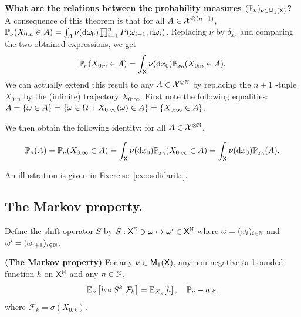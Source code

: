 \documentclass[english,graybox,envcountchap,envcountsame,sectrefs,shortlabels]{svmono}
\theoremstyle{style}
\newcommand{\bs}{\begin{shaded}}
\newcommand{\es}{\end{shaded}}
\begin{document}
\textbf{What are the relations between the probability measures $(\mathbb{P}_{\nu})_{\nu\in\mathsf{M}_{1}(\mathsf{X})}$?}
A consequence of this theorem is that for all $A\in\mathcal{X}^{\otimes(n+1)}$,
$\mathbb{P}_{\nu}(X_{0:n}\in A)=\int_{A}\nu(\mathrm{d}\omega_{0})\prod_{i=1}^{n}P(\omega_{i-1},\mathrm{d}\omega_{i})$.
Replacing $\nu$ by $\delta_{x_{0}}$ and comparing the two obtained
expressions, we get
\[
\mathbb{P}_{\nu}(X_{0:n}\in A)=\int_{\mathsf{X}}\nu(\mathrm{d} x_{0})\mathbb{P}_{x_{0}}(X_{0:n}\in A).
\]
We can actually extend this result to any $A\in\mathcal{X}^{\otimes\mathbb{N}}$
by replacing the $n+1$ -tuple $X_{0:n}$ by the (infinite) trajectory
$X_{0:\infty}$. First note the following equalities: $A=\left\{ \omega\in A\right\} =\left\{ \omega\in\Omega\,:\,X_{0:\infty}(\omega)\in A\right\}=\left\{ X_{0:\infty}\in A\right\} $.
\begin{framed}
We then obtain the following identity: for all $A\in\mathcal{X}^{\otimes\mathbb{N}}$,

\begin{equation}
\mathbb{P}_{\nu}(A)=\mathbb{P}_{\nu}(X_{0:\infty}\in A)=\int_{\mathsf{X}}\nu(\mathrm{d} x_{0})\mathbb{P}_{x_{0}}(X_{0:\infty}\in A)=\int_{\mathsf{X}}\nu(\mathrm{d} x_{0})\mathbb{P}_{x_{0}}(A).\label{eq:relation:P}
\end{equation}

\end{framed}

An illustration is given in Exercise~\ref{exo:solidarite}.
\subsection{The Markov property.} 

Define the shift operator $S$ by $S:\mathsf{X}^{\mathbb{N}}\ni\omega\mapsto\omega'\in\mathsf{X}^{\mathbb{N}}$
where $\omega=(\omega_{i})_{i\in\mathbb{N}}$ and $\omega'=(\omega_{i+1})_{i\in\mathbb{N}}$.

\bs
\begin{theorem}
\textbf{(The Markov property)} For any $\nu\in\mathsf{M}_{1}(\mathsf{X})$, any
non-negative or bounded function $h$ on $\mathsf{X}^{\mathbb{N}}$ and any
$n\in\mathbb{N}$,
\begin{equation}
\mathbb{E}_{\nu}\left[h\circ S^{k}|\mathcal{F}_{k}\right]=\mathbb{E}_{X_{k}}[h]\,,\quad\mathbb{P}_{\nu}-a.s.\label{eq:MarkovProperty}
\end{equation}
where $\mathcal{F}_{k}=\sigma(X_{0:k})$.
\end{theorem}
\es
\end{document}
